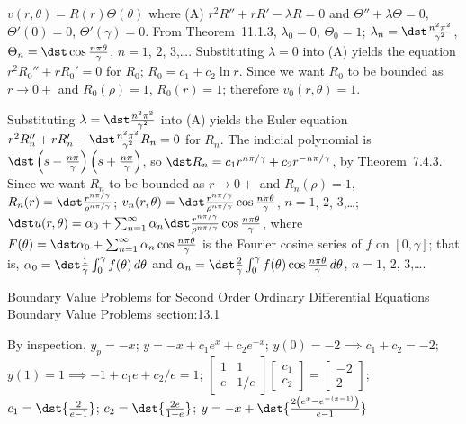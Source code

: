 \documentclass[dvips]{book}
\renewcommand{\exer}[1]{\par\medskip\;\noindent{\color{red}\bf #1.}}
\numberwithin{example}{section}
\numberwithin{equation}{section}
\numberwithin{theorem}{section}
\numberwithin{table}{section}
\numberwithin{figure}{section}
\begin{document}
\exer{12.4.6}
 $v(r,\theta)=R(r)\Theta(\theta)$ where
(A) $r^2R''+rR'-\lambda R=0$
and
$\Theta''+\lambda\Theta=0$, $\Theta'(0)=0$, $\Theta'(\gamma)=0$.
From Theorem~11.1.3,  $\lambda_0=0$, $\Theta_0=1$;
$\lambda_n=\dst\frac{n^2\pi^2}{\gamma^2}$,
 $\Theta_n=\dst\cos\frac
{n\pi\theta}{\gamma}$,
$n=1$,  $2$, $3$,\dots.
Substituting $\lambda=0$ into (A) yields the
equation $r^2R_0''+rR_0'=0$ for $R_0$;
$R_0=c_1+c_2\ln r$. Since we want $R_0$ to be bounded as $r\to0+$
and  $R_0(\rho)=1$, $R_0(r)=1$; therefore $v_0(r,\theta)=1$.

Substituting $\lambda=\dst\frac{n^2\pi^2}{\gamma^2}$ into (A) yields
the Euler equation
$r^2R_n''+rR_n'-\dst\frac{n^2\pi^2}{\gamma^2} R_n=0$
for $R_n$.
The indicial polynomial  is
$\dst
\left(s-\frac{n\pi}{\gamma}\right)
\left(s+\frac{n\pi}{\gamma}\right)$,
so
$\dst R_n=c_1r^{n\pi/\gamma}+c_2r^{-n\pi/\gamma}$,
by Theorem~7.4.3.
Since we want  $R_n$ to be bounded as $r\to0+$ and $R_n(\rho)=1$,
$R_n(r)=\dst\frac{r^{n\pi/\gamma}}{\rho^{n\pi/\gamma}}$;
$v_n(r,\theta)=
\dst\frac{r^{n\pi/\gamma}}{\rho^{n\pi/\gamma}}\cos\frac{n\pi\theta}{\gamma}$,
$n=1$, $2$, $3$,\dots;
$\dst u(r,\theta)=\alpha_0+\sum_{n=1}^\infty\alpha_n
\dst\frac{r^{n\pi/\gamma}}{\rho^{n\pi/\gamma}}\cos\frac{n\pi\theta}{\gamma}$,
where
$F(\theta)=\dst\alpha_0+\sum_{n=1}^\infty\alpha_n\cos\frac{n\pi\theta}{\gamma}$
is the Fourier cosine series of $f$ on $[0,\gamma]$; that is,
$\alpha_0=\dst\frac{1}{\gamma}\int_0^\gamma f(\theta)\,d\theta$
and
$\alpha_n=\dst\frac{2}{\gamma}\int_0^\gamma
f(\theta)\cos\frac{n\pi\theta}{\gamma}\,d\theta$, $n=1$, $2$,
$3$,\dots.



\newpage
\thispagestyle{empty}
\mbox{}
\newpage
\thispagestyle{empty}
\setcounter{chapter}{13}

{Boundary Value Problems for Second Order Ordinary
Differential Equations}
{Boundary Value Problems}
 {section:13.1}

\renewcommand{\thissection}
{}
\thissection



\vspace*{-17.5pt}

\exer{13.1.2} By  inspection, $y_{p}=-x$;
$y=-x+c_{1}e^{x}+c_{2}e^{-x}$;
$y(0)=-2 \implies c_{1}+c_{2}=-2$;
$y(1)=1 \implies -1+c_{1}e+c_{2}/e=1$;
$
\left[\begin{array}{ccccccc}
1&1 \\e&1/e
\end{array}\right]
\left[\begin{array}{ccccccc}
c_{1}\\c_{2}
\end{array}\right]=
\left[\begin{array}{rcccccc}
-2\\2
\end{array}\right]$;
$c_{1}=\dst{\frac{2}{e-1}}$;
$c_{2}=\dst{\frac{2e}{1-e}}$;
$y=-x+ \dst{\frac{2\left(e^{x}-e^{-(x-1)}\right)}{e-1}}$
\end{document}
